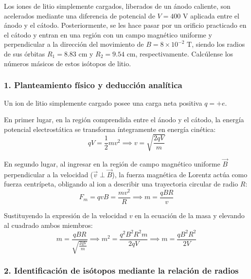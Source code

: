 \begin{problema}
Los iones de litio simplemente cargados, liberados de un ánodo caliente, son acelerados mediante una diferencia de potencial de $V = 400\text{ V}$ aplicada entre el ánodo y el cátodo. Posteriormente, se les hace pasar por un orificio practicado en el cátodo y entran en una región con un campo magnético uniforme y perpendicular a la dirección del movimiento de $B = 8 \times 10^{-2}\text{ T}$, siendo los radios de sus órbitas $R_1 = 8.83\text{ cm}$ y $R_2 = 9.54\text{ cm}$, respectivamente. Calcúlense los números másicos de estos isótopos de litio.

\tcblower

\subsubsection*{1. Planteamiento físico y deducción analítica}

Un ion de litio simplemente cargado posee una carga neta positiva $q = +e$.

En primer lugar, en la región comprendida entre el ánodo y el cátodo, la energía potencial electrostática se transforma íntegramente en energía cinética:
\begin{equation}
q V = \frac{1}{2} m v^2 \implies v = \sqrt{\frac{2 q V}{m}}
\end{equation}

En segundo lugar, al ingresar en la región de campo magnético uniforme $\vec{B}$ perpendicular a la velocidad ($\vec{v} \perp \vec{B}$), la fuerza magnética de Lorentz actúa como fuerza centrípeta, obligando al ion a describir una trayectoria circular de radio $R$:
\begin{equation}
F_m = q v B = \frac{m v^2}{R} \implies m = \frac{q B R}{v}
\end{equation}

Sustituyendo la expresión de la velocidad $v$ en la ecuación de la masa y elevando al cuadrado ambos miembros:
\begin{equation}
m = \frac{q B R}{\sqrt{\frac{2 q V}{m}}} \implies m^2 = \frac{q^2 B^2 R^2 m}{2 q V} \implies m = \frac{q B^2 R^2}{2 V}
\end{equation}

\subsubsection*{2. Identificación de isótopos mediante la relación de radios}


\end{problema}
